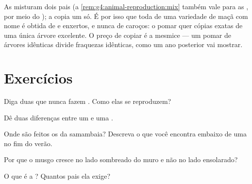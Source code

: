 \begin{remark}\label{rem:g4:plants-without-seeds:copy}
As  misturam dois pais (a
\cref{rem:g4:animal-reproduction:mix} também vale para as ,
por meio do ); a  copia um só. É por isso
que toda  de uma variedade de maçã com nome é obtida de
 e enxertos, e nunca de caroços: o pomar quer cópias exatas
de uma única árvore excelente. O preço de copiar é a mesmice --- um
pomar de árvores idênticas divide fraquezas idênticas, como um ano
posterior vai mostrar.
\end{remark}

\section{Exercícios}

\begin{exercise}[$\star$]\label{exo:g4:plants-without-seeds:1}
Diga duas  que nunca fazem . Como elas se reproduzem?
\end{exercise}

\begin{exercise}[$\star$]\label{exo:g4:plants-without-seeds:2}
Dê duas diferenças entre um  e uma .
\end{exercise}

\begin{exercise}[$\star$]\label{exo:g4:plants-without-seeds:3}
Onde são feitos os  da samambaia? Descreva o que você
encontra embaixo de uma  no fim do verão.
\end{exercise}

\begin{exercise}[$\star$]\label{exo:g4:plants-without-seeds:4}
Por que o musgo cresce no lado sombreado do muro e não no lado
ensolarado?
\end{exercise}

\begin{exercise}[$\star$]\label{exo:g4:plants-without-seeds:5}
O que é a ? Quantos pais ela exige?
\end{exercise}


